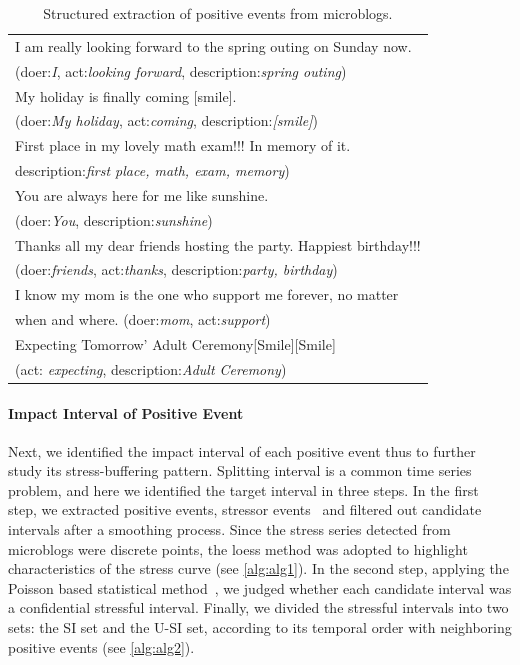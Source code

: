 \begin{table}
\begin{center}
\caption{\small{Structured extraction of positive events from microblogs.}}
\small{
\begin{tabular}{l} \hline \rowcolor{gray!40}
I am really looking forward to the spring outing on Sunday now. \\ \rowcolor{gray!40}
(doer:\emph{I}, act:\emph{looking forward}, description:\emph{spring outing})\\
My holiday is finally coming [smile]. \\
(doer:\emph{My holiday}, act:\emph{coming}, description:\emph{[smile]})\\ \rowcolor{gray!40}%
First place in my lovely math exam!!! In memory of it.\\ \rowcolor{gray!40}
description:\emph{first place, math, exam, memory})\\ %
You are always here for me like sunshine. \\
(doer:\emph{You}, description:\emph{sunshine})\\ \rowcolor{gray!40} %
Thanks all my dear friends hosting the party.
Happiest birthday!!!\\ \rowcolor{gray!40}
(doer:\emph{friends}, act:\emph{thanks}, description:\emph{party, birthday})\\
I know my mom is the one who support me forever, no matter \\
when and where. (doer:\emph{mom}, act:\emph{support})\\ \rowcolor{gray!40}
Expecting Tomorrow' Adult Ceremony[Smile][Smile]~~\\ \rowcolor{gray!40}
(act: \emph{expecting}, description:\emph{Adult Ceremony})\\ \hline
\end{tabular}}
\label{tab:uplifts}
\end{center}
\end{table}

\paragraph{Impact Interval of Positive Event}
Next, we identified the impact interval of each positive event thus to further study its stress-buffering pattern.
Splitting interval is a common time series problem, and here we identified the target interval in three steps.
In the first step, we extracted positive events, stressor events~\citep{Li2017Analyzing} and filtered out candidate intervals after a smoothing process.
Since the stress series detected from microblogs were discrete points,
the loess method was adopted to highlight characteristics of the stress curve (see \ref{alg:alg1}).
In the second step, applying the Poisson based statistical method~\citep{Li2017Analyzing},
we judged whether each candidate interval was a confidential stressful interval.
Finally, we divided the stressful intervals into two sets: the SI set and the U-SI set,
according to its temporal order with neighboring positive events (see \ref{alg:alg2}).
